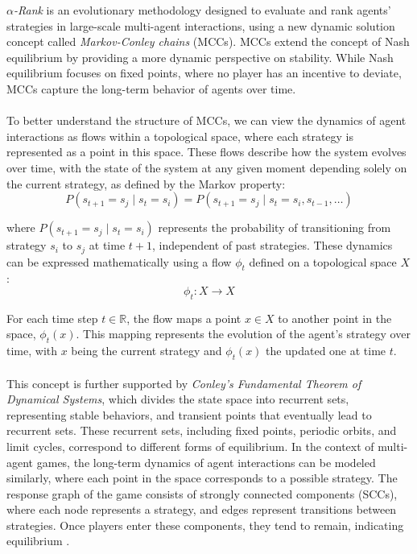 \begin{flushleft}
    \begin{flushleft}

        \emph{$\alpha$-Rank} is an evolutionary methodology designed to evaluate and rank agents' strategies in large-scale multi-agent interactions, using a new dynamic solution concept called \emph{Markov-Conley chains} (MCCs). MCCs extend the concept of Nash equilibrium by providing a more dynamic perspective on stability. While Nash equilibrium focuses on fixed points, where no player has an incentive to deviate, MCCs capture the long-term behavior of agents over time.\\~\\
        
        To better understand the structure of MCCs, we can view the dynamics of agent interactions as flows within a topological space, where each strategy is represented as a point in this space. These flows describe how the system evolves over time, with the state of the system at any given moment depending solely on the current strategy, as defined by the Markov property:
        \begin{equation}
            P(s_{t+1} = s_j \mid s_t = s_i) = P(s_{t+1} = s_j \mid s_t = s_i, s_{t-1}, \dots)
            \label{eq:markov_property}
        \end{equation}
        
        where $P(s_{t+1} = s_j \mid s_t = s_i)$ represents the probability of transitioning from strategy $s_i$ to $s_j$ at time $t+1$, independent of past strategies. These dynamics can be expressed mathematically using a flow $\phi_t$ defined on a topological space $X$:
        \begin{equation}
            \phi_t: X \rightarrow X
            \label{eq:flow_phi}
        \end{equation}

        For each time step $t \in \mathbb{R}$, the flow maps a point $x \in X$ to another point in the space, $\phi_t(x)$. This mapping represents the evolution of the agent’s strategy over time, with $x$ being the current strategy and $\phi_t(x)$ the updated one at time $t$.\\~\\
        
        This concept is further supported by \emph{Conley's Fundamental Theorem of Dynamical Systems}, which divides the state space into recurrent sets, representing stable behaviors, and transient points that eventually lead to recurrent sets. These recurrent sets, including fixed points, periodic orbits, and limit cycles, correspond to different forms of equilibrium. In the context of multi-agent games, the long-term dynamics of agent interactions can be modeled similarly, where each point in the space corresponds to a possible strategy. The response graph of the game consists of strongly connected components (SCCs), where each node represents a strategy, and edges represent transitions between strategies. Once players enter these components, they tend to remain, indicating equilibrium \cite{omidshafiei2019alpharank}.
        

\end{flushleft}
\end{flushleft}
